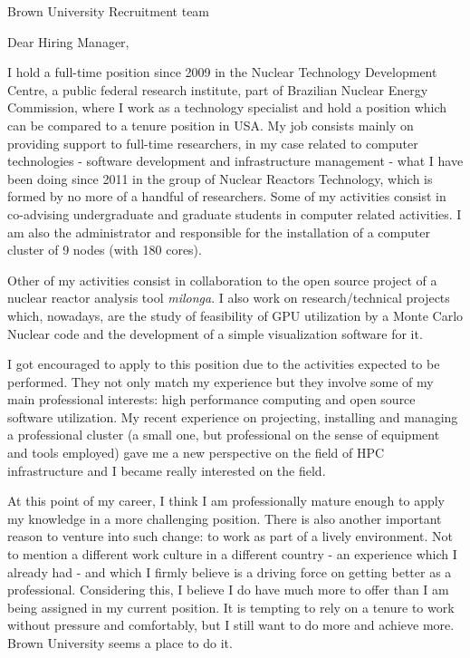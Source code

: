 \documentclass[11pt]{letter}
\begin{document}
\begin{letter}{Brown University Recruitment team}

  \opening{Dear Hiring Manager,}
  
  I hold a full-time position since 2009 in the Nuclear Technology Development Centre, a public federal
  research institute, part of Brazilian Nuclear Energy Commission, where I work as a technology
  specialist and hold a position which can be compared to a tenure position in USA. My job consists mainly on
  providing support to full-time researchers, in my case
  related to computer technologies - software development and infrastructure management - what I have been
  doing since 2011 in the group of Nuclear Reactors Technology, which is formed by no more of a handful of researchers.
  Some of my activities consist in co-advising undergraduate and graduate students in computer related
  activities. I am also the administrator and responsible for the installation of a
  computer cluster of 9 nodes (with 180 cores).

  Other of my activities consist in collaboration
  to the open source project of a nuclear reactor
  analysis tool \textit{milonga}. I also work on research/technical projects which, nowadays, are the study of
  feasibility of GPU utilization by a Monte Carlo Nuclear code and the development of
  a simple visualization software for it.
  
  I got encouraged to apply to this position due to the activities expected to be performed. They not only
  match my experience but they involve some of my main professional interests: high performance computing
  and open source software utilization. %
  My recent experience on projecting, installing and managing a professional
  cluster (a small one, but professional on the sense of equipment and tools employed) gave me a new perspective
  on the field of HPC infrastructure and I became really interested on the field.
  
  At this point of my career, I think I am professionally mature enough to apply my knowledge in a more
  challenging position. There is also another important reason to venture into such change: to work
  as part of a lively environment. Not to mention a different work culture in a different country - an
  experience which I already had - and which I firmly believe is a driving force on getting better as a professional.
  Considering this, I believe I do have much more to offer than I am being assigned in my current position. 
  It is tempting to rely on a tenure to work without pressure and comfortably, but I still want to do more and
  achieve more. Brown University seems a place to do it.
  

\end{letter}
\end{document}
